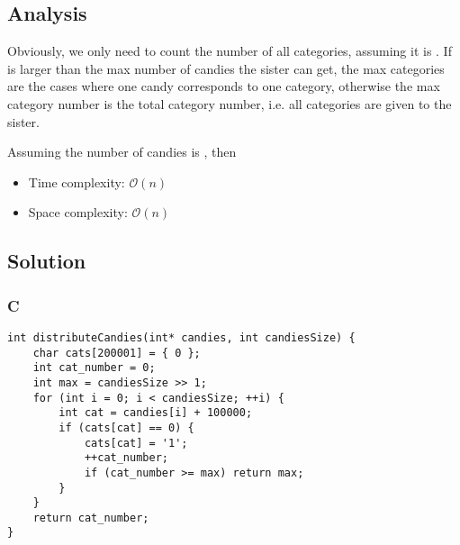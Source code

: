 \subsection*{Analysis}
Obviously, we only need to count the number of all categories, assuming it is . If  is larger than the max number of candies the sister can get, the max categories are the cases where one candy corresponds to one category, otherwise the max category number is the total category number, i.e. all categories are given to the sister.

Assuming the number of candies is , then
\begin{itemize}
    \item Time complexity: $\mathcal{O}(n)$
    \item Space complexity: $\mathcal{O}(n)$
\end{itemize}

\subsection*{Solution}
\subsubsection{C}
\begin{verbatim}
int distributeCandies(int* candies, int candiesSize) {
    char cats[200001] = { 0 };
    int cat_number = 0;
    int max = candiesSize >> 1;
    for (int i = 0; i < candiesSize; ++i) {
        int cat = candies[i] + 100000;
        if (cats[cat] == 0) {
            cats[cat] = '1';
            ++cat_number;
            if (cat_number >= max) return max;
        }
    }
    return cat_number;
}
\end{verbatim}

\newpage

